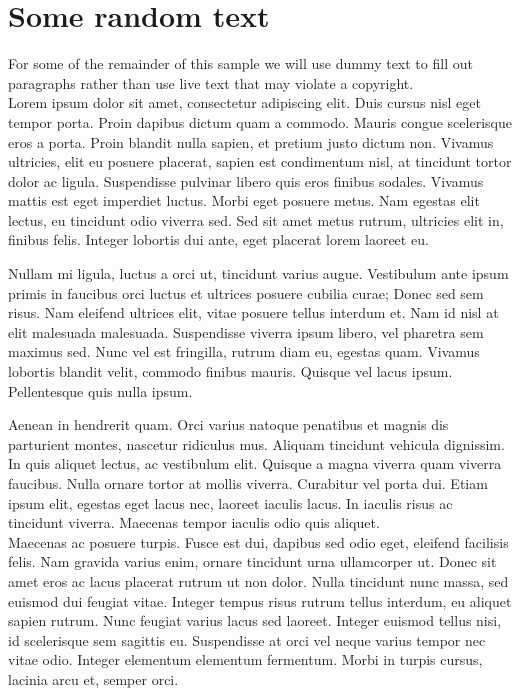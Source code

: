 \documentclass[
  journal,
]{IEEEtran}%
\theoremstyle{plain}
\theoremstyle{remark}
\begin{document}
\hypertarget{some-random-text}{%
\section{Some random text}\label{some-random-text}}

For some of the remainder of this sample we will use dummy text to fill
out paragraphs rather than use live text that may violate a copyright.
\IEEEpubidadjcol\\
Lorem ipsum dolor sit amet, consectetur adipiscing elit. Duis cursus
nisl eget tempor porta. Proin dapibus dictum quam a commodo. Mauris
congue scelerisque eros a porta. Proin blandit nulla sapien, et pretium
justo dictum non. Vivamus ultricies, elit eu posuere placerat, sapien
est condimentum nisl, at tincidunt tortor dolor ac ligula. Suspendisse
pulvinar libero quis eros finibus sodales. Vivamus mattis est eget
imperdiet luctus. Morbi eget posuere metus. Nam egestas elit lectus, eu
tincidunt odio viverra sed. Sed sit amet metus rutrum, ultricies elit
in, finibus felis. Integer lobortis dui ante, eget placerat lorem
laoreet eu.

Nullam mi ligula, luctus a orci ut, tincidunt varius augue. Vestibulum
ante ipsum primis in faucibus orci luctus et ultrices posuere cubilia
curae; Donec sed sem risus. Nam eleifend ultrices elit, vitae posuere
tellus interdum et. Nam id nisl at elit malesuada malesuada. Suspendisse
viverra ipsum libero, vel pharetra sem maximus sed. Nunc vel est
fringilla, rutrum diam eu, egestas quam. Vivamus lobortis blandit velit,
commodo finibus mauris. Quisque vel lacus ipsum. Pellentesque quis nulla
ipsum.

Aenean in hendrerit quam. Orci varius natoque penatibus et magnis dis
parturient montes, nascetur ridiculus mus. Aliquam tincidunt vehicula
dignissim. In quis aliquet lectus, ac vestibulum elit. Quisque a magna
viverra quam viverra faucibus. Nulla ornare tortor at mollis viverra.
Curabitur vel porta dui. Etiam ipsum elit, egestas eget lacus nec,
laoreet iaculis lacus. In iaculis risus ac tincidunt viverra. Maecenas
tempor iaculis odio quis aliquet.\\
Maecenas ac posuere turpis. Fusce est dui, dapibus sed odio eget,
eleifend facilisis felis. Nam gravida varius enim, ornare tincidunt urna
ullamcorper ut. Donec sit amet eros ac lacus placerat rutrum ut non
dolor. Nulla tincidunt nunc massa, sed euismod dui feugiat vitae.
Integer tempus risus rutrum tellus interdum, eu aliquet sapien rutrum.
Nunc feugiat varius lacus sed laoreet. Integer euismod tellus nisi, id
scelerisque sem sagittis eu. Suspendisse at orci vel neque varius tempor
nec vitae odio. Integer elementum elementum fermentum. Morbi in turpis
cursus, lacinia arcu et, semper orci.
\end{document}
